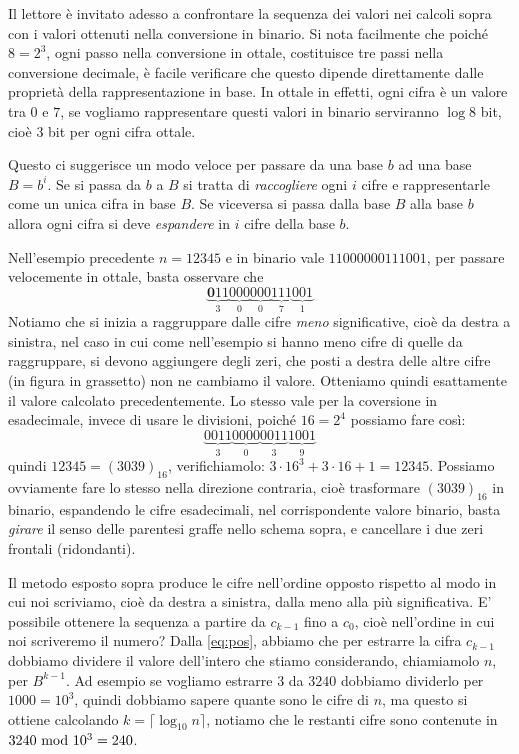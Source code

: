 Il lettore è invitato adesso a confrontare la sequenza dei valori nei calcoli sopra con i valori ottenuti nella conversione in binario. Si nota facilmente che poiché $8 = 2^3$, ogni passo nella conversione in ottale, costituisce tre passi nella conversione decimale, è facile verificare che questo dipende direttamente dalle proprietà della rappresentazione in base. In ottale in effetti, ogni cifra è un valore tra $0$ e $7$, se vogliamo rappresentare questi valori in binario serviranno $\log 8$ bit, cioè $3$ bit per ogni cifra ottale. 

Questo ci suggerisce un modo veloce per passare da una base $b$ ad una base $B=b^i$. Se si passa da $b$ a $B$ si tratta di \emph{raccogliere} ogni $i$ cifre e rappresentarle come un unica cifra in base $B$. Se viceversa si passa dalla base $B$ alla base $b$ allora ogni cifra si deve \emph{espandere} in $i$
cifre della base $b$. 

\begin{ex}
Nell'esempio precedente $n=12345$ e in binario vale $11000000111001$, per passare velocemente in ottale, basta osservare che 
\[
\underbrace{\mathbf{0}11}_{3}\underbrace{000}_{0}\underbrace{000}_{0}\underbrace{111}_{7}\underbrace{001}_{1}
\]
\noindent Notiamo che si inizia a raggruppare dalle cifre \emph{meno} significative, cioè da destra a sinistra, nel caso in cui come nell'esempio si hanno meno cifre di quelle da raggruppare, si devono aggiungere degli zeri, che posti a destra delle altre cifre (in figura in grassetto) non ne cambiamo il valore. Otteniamo
quindi esattamente il valore calcolato precedentemente. Lo stesso vale per la coversione in esadecimale, invece di usare le divisioni, poiché $16 = 2^4$ possiamo fare così:
\[
\underbrace{0011}_{3}\underbrace{0000}_{0}\underbrace{0011}_{3}\underbrace{1001}_{9}
\]
quindi $12345 = (3039)_{16}$, verifichiamolo: $3\cdot{16}^3+3\cdot{16}+1 = 12345$. Possiamo ovviamente fare lo stesso nella direzione contraria, cioè trasformare $(3039)_{16}$ in binario, espandendo le cifre esadecimali, nel corrispondente valore binario, basta \emph{girare} il senso delle parentesi graffe nello schema sopra, e cancellare i due zeri frontali (ridondanti).
\end{ex}

Il metodo esposto sopra produce le cifre nell'ordine opposto rispetto al modo in cui noi scriviamo,   
cioè da destra a sinistra, dalla meno alla più significativa. E' possibile ottenere la sequenza a partire da $c_{k-1}$ fino
a $c_0$, cioè nell'ordine in cui noi scriveremo il numero? Dalla \eqref{eq:pos},
abbiamo che per estrarre la cifra $c_{k-1}$ dobbiamo dividere il valore dell'intero che stiamo considerando, chiamiamolo $n$, per $B^{k-1}$. Ad esempio
se vogliamo estrarre $3$ da $3240$ dobbiamo dividerlo per $1000 = 10^3$, quindi dobbiamo sapere quante sono le cifre di $n$, ma questo si ottiene calcolando 
$k = \lceil \log_{10} n \rceil$, notiamo che le restanti cifre sono contenute in $3240 \ \text{mod}\ 10^3 = 240$.

